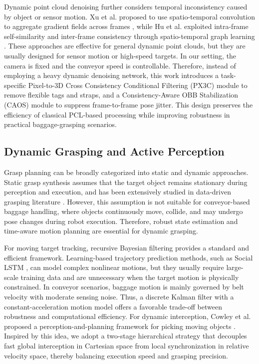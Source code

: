 Dynamic point cloud denoising further considers temporal inconsistency caused by object or sensor motion. Xu et al. proposed to use spatio-temporal convolution to aggregate gradient fields across frames \cite{hu2025dynamic}, while Hu et al. exploited intra-frame self-similarity and inter-frame consistency through spatio-temporal graph learning \cite{hu2021dynamic}. These approaches are effective for general dynamic point clouds, but they are usually designed for sensor motion or high-speed targets. In our setting, the camera is fixed and the conveyor speed is controllable. Therefore, instead of employing a heavy dynamic denoising network, this work introduces a task-specific Pixel-to-3D Cross Consistency Conditional Filtering (PX3C) module to remove flexible tags and straps, and a Consistency-Aware OBB Stabilization (CAOS) module to suppress frame-to-frame pose jitter. This design preserves the efficiency of classical PCL-based processing while improving robustness in practical baggage-grasping scenarios.


\subsection{Dynamic Grasping and Active Perception}

Grasp planning can be broadly categorized into static and dynamic approaches. Static grasp synthesis assumes that the target object remains stationary during perception and execution, and has been extensively studied in data-driven grasping literature \cite{bohg2013data}. However, this assumption is not suitable for conveyor-based baggage handling, where objects continuously move, collide, and may undergo pose changes during robot execution. Therefore, robust state estimation and time-aware motion planning are essential for dynamic grasping.

For moving target tracking, recursive Bayesian filtering provides a standard and efficient framework. Learning-based trajectory prediction methods, such as Social LSTM \cite{alahi2016social}, can model complex nonlinear motions, but they usually require large-scale training data and are unnecessary when the target motion is physically constrained. In conveyor scenarios, baggage motion is mainly governed by belt velocity with moderate sensing noise. Thus, a discrete Kalman filter with a constant-acceleration motion model \cite{li2003survey} offers a favorable trade-off between robustness and computational efficiency. For dynamic interception, Cowley et al. proposed a perception-and-planning framework for picking moving objects \cite{cowley2013perception}. Inspired by this idea, we adopt a two-stage hierarchical strategy that decouples fast global interception in Cartesian space from local synchronization in relative velocity space, thereby balancing execution speed and grasping precision.

